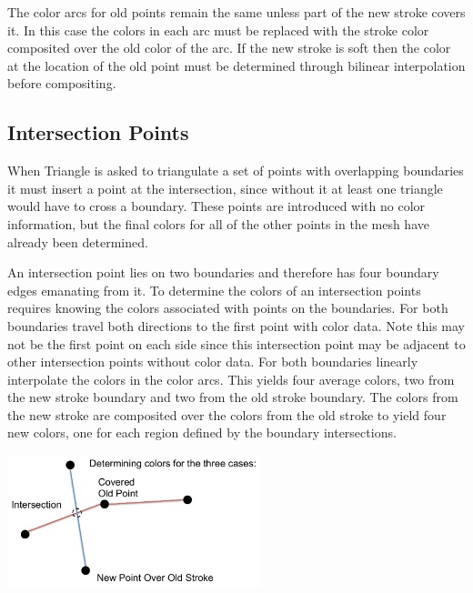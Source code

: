 \documentclass[conference]{acmsiggraph}
\begin{document}
The color arcs for old points remain the same unless part of the new stroke covers it.
In this case the colors in each arc must be replaced with the stroke color composited over
the old color of the arc. If the new stroke is soft then the color at the location of
the old point must be determined through bilinear interpolation before compositing.




\subsection{Intersection Points}

When Triangle is asked to triangulate a set of points with overlapping boundaries it must
insert a point at the intersection, since without it at least one triangle would have to
cross a boundary. These points are introduced with no color information, but the final colors for 
all of the other points in the mesh have already been determined.

An intersection point lies on two boundaries and therefore has four boundary edges emanating from it. 
To determine the colors of an intersection points requires knowing the colors associated with
points on the boundaries. For both boundaries travel both directions to the first point with color data. Note this may not
be the first point on each side since this intersection point may be adjacent to other intersection
points without color data. For both boundaries linearly interpolate the colors in the color arcs. 
This yields four average colors, two from the new stroke boundary and two from the old stroke boundary.
The colors from the new stroke are composited over the colors from the old stroke to yield four new
colors, one for each region defined by the boundary intersections. 

\includegraphics[height=1.5in]{images/determiningcolors}
\end{document}
